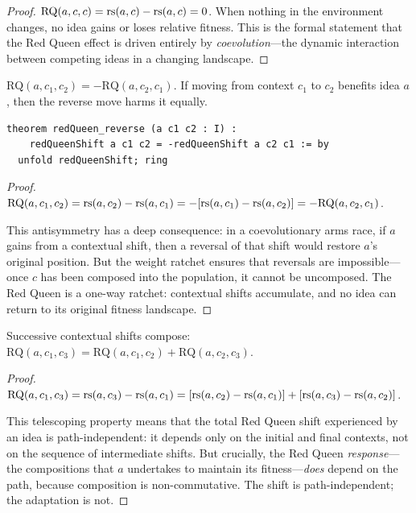 \begin{proof}
$\text{RQ}(a, c, c) = \mathrm{rs}(a, c) - \mathrm{rs}(a, c) = 0$.  When nothing in the
environment changes, no idea gains or loses relative fitness.  This is the
formal statement that the Red Queen effect is driven entirely by
\emph{coevolution}---the dynamic interaction between competing ideas in a
changing landscape.
\end{proof}

\begin{theorem}
\label{thm:rq-reversal}
$\text{RQ}(a, c_1, c_2) = -\text{RQ}(a, c_2, c_1)$.  If moving from context
$c_1$ to $c_2$ benefits idea $a$, then the reverse move harms it equally.

\begin{lstlisting}[caption={Lean 4: Red Queen reversal}]
theorem redQueen_reverse (a c1 c2 : I) :
    redQueenShift a c1 c2 = -redQueenShift a c2 c1 := by
  unfold redQueenShift; ring
\end{lstlisting}
\end{theorem}

\begin{proof}
$\text{RQ}(a, c_1, c_2) = \mathrm{rs}(a, c_2) - \mathrm{rs}(a, c_1) = -[\mathrm{rs}(a, c_1) -
\mathrm{rs}(a, c_2)] = -\text{RQ}(a, c_2, c_1)$.

This antisymmetry has a deep consequence: in a coevolutionary arms race,
if $a$ gains from a contextual shift, then a reversal of that shift would
restore $a$'s original position.  But the weight ratchet ensures that
reversals are impossible---once $c$ has been composed into the population,
it cannot be uncomposed.  The Red Queen is a one-way ratchet: contextual
shifts accumulate, and no idea can return to its original fitness landscape.
\end{proof}

\begin{theorem}
\label{thm:rq-composition}
Successive contextual shifts compose:
$\text{RQ}(a, c_1, c_3) = \text{RQ}(a, c_1, c_2) + \text{RQ}(a, c_2, c_3)$.
\end{theorem}

\begin{proof}
$\text{RQ}(a, c_1, c_3) = \mathrm{rs}(a, c_3) - \mathrm{rs}(a, c_1) = [\mathrm{rs}(a, c_2) -
\mathrm{rs}(a, c_1)] + [\mathrm{rs}(a, c_3) - \mathrm{rs}(a, c_2)]$.

This telescoping property means that the total Red Queen shift experienced by
an idea is path-independent: it depends only on the initial and final contexts,
not on the sequence of intermediate shifts.  But crucially, the Red Queen
\emph{response}---the compositions that $a$ undertakes to maintain its
fitness---\emph{does} depend on the path, because composition is
non-commutative.  The shift is path-independent; the adaptation is not.
\end{proof}

